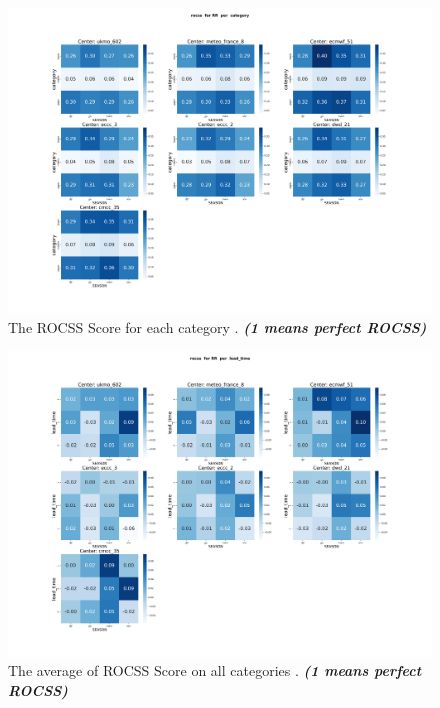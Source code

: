 \begin{figure}[H]
    \centering
    \includegraphics[scale=0.25]{plots/prob/rocss/rocss_RR_category.png}
    \caption{The ROCSS Score for each category  . \textbf{\textit{(1 means perfect ROCSS)}}}
\end{figure}


\begin{figure}[H]
    \centering
    \includegraphics[scale=0.25]{plots/prob/rocss/rocss_RR_lead_time.png}
    \caption{The average of  ROCSS Score on all categories    . \textbf{\textit{(1 means perfect ROCSS)}}}
\end{figure}


